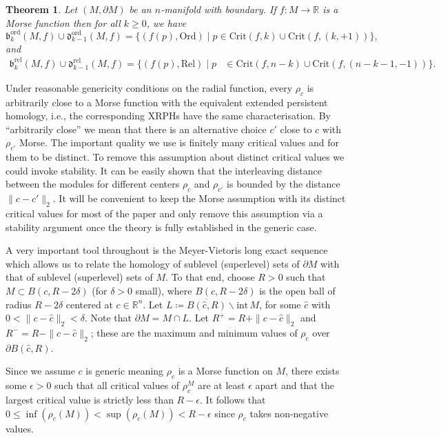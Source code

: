 \documentclass[a4paper,11pt]{article}
\newtheorem{theorem}{Theorem}[section]
\theoremstyle{definition}
\newcommand{\R}{\mathbb{R}}
\begin{document}
\begin{theorem}\label{breakpoint}
Let $(M,\partial M)$ be an $n$-manifold with boundary. If $f:M\to \R$ is a Morse function then for all $k\geq 0$, we have
$$\mathfrak{b}_k^\text{ord}(M,f) \cup \mathfrak{d}_{k-1}^\text{ord}(M,f) = \{(f(p),\text{Ord}) \;\vert\; p\in \text{Crit}(f,k)\cup \text{Crit}(f,(k,+1))\},$$ and
\begin{align*}
    \mathfrak{b}_k^\text{rel}(M,f) \cup \mathfrak{d}_{k-1}^\text{rel}(M,f) = \{(f(p),\text{Rel}) \;\vert\; p&\in \text{Crit}(f,n-k)\cup \text{Crit}(f,(n-k-1,-1))\}.
\end{align*}
\end{theorem}
Under reasonable genericity conditions on the radial function, every $\rho_c$ is  arbitrarily close to a Morse function with the equivalent extended persistent homology, i.e., the corresponding XRPHs have the same characterisation. By ``arbitrarily close'' we mean that there is an alternative choice $c'$ close to $c$ with $\rho_{c'}$ Morse.
The important quality we use is finitely many critical values and for them to be distinct. To remove this assumption about distinct critical values we could invoke stability. It can be easily shown that the interleaving distance between the modules for different centers $\rho_c$ and $\rho_{c'}$ is bounded by the distance $\|c-c'\|_2$. It will be convenient to keep the Morse assumption with its distinct critical values for most of the paper and only remove this assumption via a stability argument once the theory is fully established in the generic case.

A very important tool throughout is the Meyer-Vietoris long exact sequence which allows us to relate the homology of sublevel (superlevel) sets of $\partial M$ with that of sublevel (superlevel) sets of $M$. To that end, choose $R>0$ such that $M\subset B(c,R-2\delta)$ (for $\delta>0$ small), where $B(c,R-2\delta)$ is the open ball of radius $R-2\delta$ centered at $c\in\R^n$. 
Let $L \coloneqq \overline{B(\hat{c},R)}\backslash \text{int}\,M$, for some $\hat{c}$ with $0<\|c-\hat{c}\|_2<\delta$. Note that $\partial M = M\cap L$. Let $R^+=R+\|c-\hat{c}\|_2$ and $R^-=R-\|c-\hat{c}\|_2$; these are the maximum and minimum values of $\rho_c$ over $\partial B(\hat{c}, R)$. 

Since we assume $c$ is generic meaning $\rho_c$ is a Morse function on $M$, there exists some $\epsilon>0$ such that all critical values of $\rho_c^M$ are at least $\epsilon$ apart and that the largest critical value is strictly less than $R-\epsilon$. It follows that $ 0 \leq \inf(\rho_c(M)) < \sup(\rho_c(M)) < R-\epsilon$ since $\rho_c$ takes non-negative values.  
\end{document}
